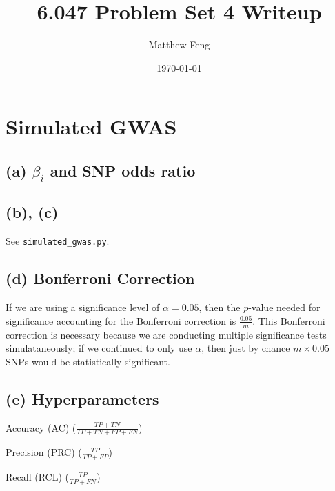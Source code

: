 \documentclass{article}[11pt]
\title{6.047 Problem Set 4 Writeup}
\author{Matthew Feng}
\date{\today}
\begin{document}
\maketitle

\section{Simulated GWAS}

\subsection*{(a) $\beta_i$ and SNP odds ratio}
\subsection*{(b), (c)}
See {\tt simulated\_gwas.py}.

\subsection*{(d) Bonferroni Correction}
If we are using a significance level of $\alpha = 0.05$, then
the $p$-value needed for significance accounting for the
Bonferroni correction is $\frac{0.05}{m}$. This Bonferroni
correction is necessary because we are conducting
multiple significance tests simulataneously;
if we continued to only use $\alpha$, then just by chance
$m \times 0.05$ SNPs would be statistically significant.

\subsection*{(e) Hyperparameters}
Accuracy (AC) ($\frac{TP + TN}{TP + TN + FP + FN}$)

\vspace{1em}
\noindent Precision (PRC) ($\frac{TP}{TP + FP}$)

\vspace{1em}
\noindent Recall (RCL) ($\frac{TP}{TP + FN}$)
\end{document}
